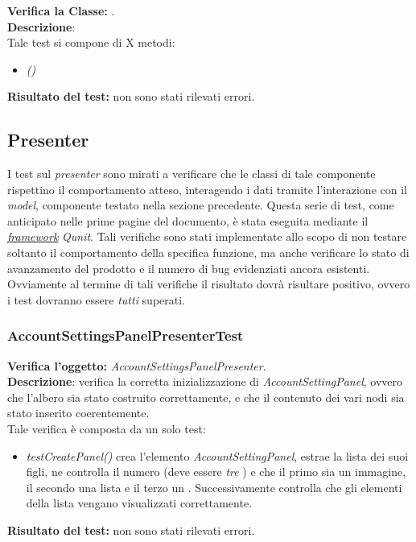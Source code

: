 \subsubsection{}
\textbf{Verifica la Classe:} \textit{}.\\
\textbf{Descrizione}:\\
Tale test si compone di X metodi:
\begin{itemize}
\item \textit{() }
\end{itemize}
\textbf{Risultato del test:} non sono stati rilevati errori.


\subsection{Presenter}
I test sul \textit{presenter} sono mirati a verificare che le classi di tale componente rispettino il comportamento atteso, interagendo i dati tramite l'interazione con il \textit{model}, componente testato nella sezione precedente. Questa serie di test, come anticipato nelle prime pagine del documento, è stata eseguita mediante il \underline{\textit{framework}} \textit{Qunit}. Tali verifiche sono stati implementate allo scopo di non testare soltanto il comportamento della specifica funzione, ma anche verificare lo stato di avanzamento del prodotto e il numero di bug evidenziati ancora esistenti.
Ovviamente al termine di tali verifiche il risultato dovrà risultare positivo, ovvero i test dovranno essere \textit{tutti} superati.

\subsubsection{AccountSettingsPanelPresenterTest}
\textbf{Verifica l'oggetto:} \textit{AccountSettingsPanelPresenter}.\\
\textbf{Descrizione}: verifica la corretta inizializzazione di \textit{AccountSettingPanel}, ovvero che l'albero sia stato costruito correttamente, e che il contenuto dei vari nodi sia stato inserito coerentemente.\\
Tale verifica è composta da un solo test:
\begin{itemize}
\item \textit{testCreatePanel() } crea l'elemento \textit{AccountSettingPanel}, estrae la lista dei suoi figli, ne controlla il numero (deve essere \textit{tre} ) e che il primo sia un immagine, il secondo una lista e il terzo un .
Successivamente controlla che gli elementi della lista vengano visualizzati correttamente.
\end{itemize}
\textbf{Risultato del test:} non sono stati rilevati errori.

